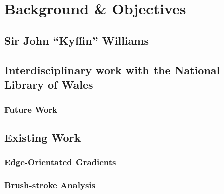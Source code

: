 \chapter{Background \& Objectives}


\section{Sir John ``Kyffin'' Williams}



\section{Interdisciplinary work with the National Library of Wales}


\subsection{Future Work}



\section{Existing Work}


\subsection{Edge-Orientated Gradients}


\subsection{Brush-stroke Analysis}



